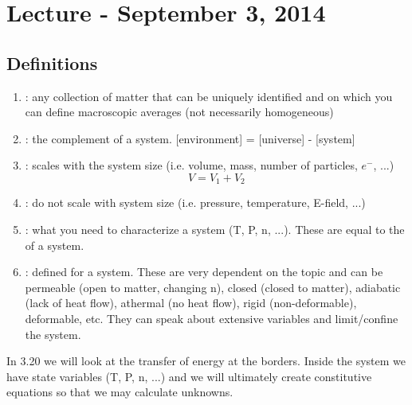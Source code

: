 \documentclass[12pt]{article}
\begin{document}

\section{Lecture - September 3, 2014}
\subsection{Definitions}
\begin{enumerate}
\item {}: any collection of matter that can be uniquely identified and on which you can define macroscopic averages (not necessarily homogeneous)
\item {}: the complement of a system.  [environment] = [universe] - [system]
\item {}: scales with the system size (i.e. volume, mass, number of particles, $e^-$, ...)
\begin{equation}
V = V_1 + V_2
\end{equation}
\item {}: do not scale with system size (i.e. pressure, temperature, E-field, ...)
\item {}: what you need to characterize a system (T, P, n, ...).  These are  equal to the  of a system.
\item {}: defined for a system.  These are very dependent on the topic and can be permeable (open to matter, changing n), closed (closed to matter), adiabatic (lack of heat flow), athermal (no heat flow), rigid (non-deformable), deformable, etc.  They can speak about extensive variables and limit/confine the system.
\end{enumerate}

In 3.20 we will look at the transfer of energy at the borders.  Inside the system we have state variables (T, P, n, ...) and we will ultimately create constitutive equations so that we may calculate unknowns.
\end{document}
